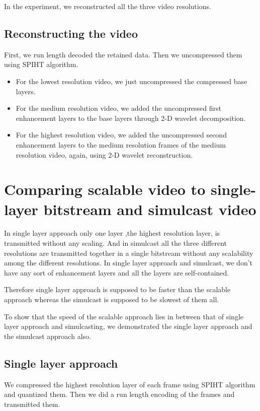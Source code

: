 \documentclass[10pt,twocolumn]{article}
\begin{document}
In the experiment, we reconstructed all the three video resolutions.

\subsection*{Reconstructing the video}
First, we run length decoded the retained data. Then we uncompressed them using SPIHT\cite{amirSaid1996} algorithm. 

\begin{itemize}
    \item For the lowest resolution video, we just uncompressed the compressed base layers.

    \item For the medium resolution video, we added the uncompressed first enhancement layers to the base layers through 2-D wavelet decomposition.

    \item For the highest resolution video, we added the uncompressed second enhancement layers to the medium resolution frames of the medium resolution video, again, using 2-D wavelet reconstruction.
\end{itemize}

\section{Comparing scalable video to single-layer bitstream and simulcast video}

In single layer approach only one layer ,the highest resolution layer, is transmitted without any scaling. And in simulcast all the three different resolutions are transmitted together in a single bitstream without any scalability among the different resolutions. In single layer approach and simulcast, we don't have any sort of enhancement layers and all the layers are self-contained.

Therefore single layer approach is supposed to be faster than the scalable approach whereas the simulcast is supposed to be slowest of them all\cite{segall2007}.

To show that the speed of the scalable approach lies in between that of single layer approach and simulcasting, we demonstrated the single layer approach and the simulcast approach also.

\subsection*{Single layer approach}
We compressed the highest resolution layer of each frame using SPIHT algorithm and quantized them. Then we did a run length encoding of the frames and transmitted them.
\end{document}
